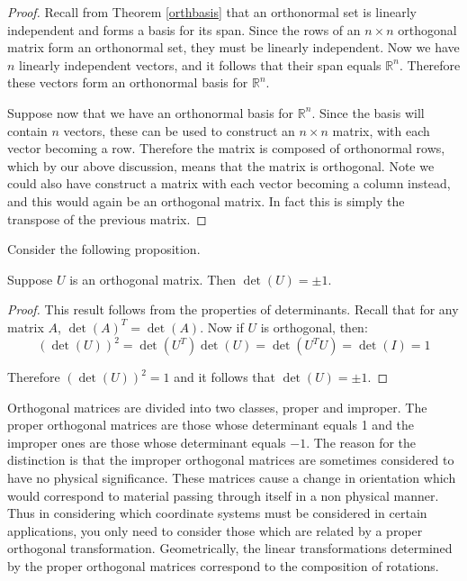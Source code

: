 \documentclass{ximera}
\begin{document}
\begin{proof}
Recall from Theorem \ref{orthbasis} that an orthonormal set is
linearly independent and forms a basis for its span. Since the rows of
an $n \times n$ orthogonal matrix form an orthonormal set, they must
be linearly independent. Now we have $n$ linearly independent vectors,
and it follows that their span equals $\mathbb{R}^n$. Therefore these
vectors form an orthonormal basis for $\mathbb{R}^n$.

Suppose now that we have an orthonormal basis for $\mathbb{R}^n$. Since the
basis will contain $n$ vectors, these can be used to construct an $n
\times n$ matrix, with each vector becoming a row. Therefore the
matrix is composed of orthonormal rows, which by our above discussion,
means that the matrix is orthogonal. Note we could also have construct
a matrix with each vector becoming a column instead, and this would
again be an orthogonal matrix. In fact this is simply the transpose of
the previous matrix.
\end{proof}

Consider the following proposition.

\begin{theorem}\label{orthoDet}
Suppose $U$ is an orthogonal matrix. Then $\det \left( U\right) = \pm 1.$
\end{theorem}

\begin{proof}
This result follows from the properties of determinants. Recall that
for any matrix $A$, $\det(A)^T = \det(A)$. Now if $U$ is orthogonal, then:
\begin{equation*}
(\det \left( U\right)) ^{2}=\det \left( U^{T}\right) \det \left( U\right)
=\det \left( U^{T}U\right) =\det \left( I\right) =1
\end{equation*}

Therefore $(\det (U))^2 = 1$ and it follows that $\det \left( U\right) = \pm 1$.
\end{proof}

Orthogonal matrices are divided into two classes, proper and improper.
The proper orthogonal matrices are those whose determinant equals 1
and the improper ones are those whose determinant equals $-1$. The
reason for the distinction is that the improper orthogonal matrices
are sometimes considered to have no physical significance. These
matrices cause a change in orientation which would correspond to
material passing through itself in a non physical manner. Thus in
considering which coordinate systems must be considered in certain
applications, you only need to consider those which are related by a
proper orthogonal transformation. Geometrically, the linear
transformations determined by the proper orthogonal matrices
correspond to the composition of rotations.
\end{document}
